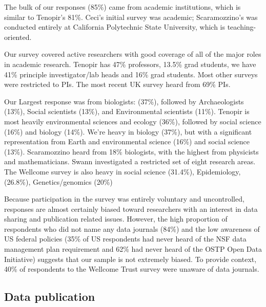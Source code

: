 \documentclass[10pt]{article}
\begin{document}
The bulk of our responses (85\%) came from academic institutions, which is similar to Tenopir's 81\%.  
Ceci's initial survey was academic\cite{ceci_scientists_1988}; Scaramozzino's was conducted entirely at California Polytechnic State University, which is teaching-oriented\cite{scaramozzino_study_2012}. 

Our survey covered active researchers with good coverage of all of the major roles in academic research.
Tenopir has 47\% professors, 13.5\% grad students, we have 41\% principle investigator/lab heads and 16\% grad students.
Most other surveys were restricted to PIs.
The most recent UK survey heard from 69\% PIs\cite{bobrow_establishing_2014}.

Our Largest response was from biologists: (37\%), followed by Archaeologists (13\%), Social scientists (13\%), and Environmental scientists (11\%). 
Tenopir is most heavily environmental sciences and ecology (36\%), followed by social science (16\%) and biology (14\%). 
We're heavy in biology (37\%), but with a significant representation from Earth and environmental science (16\%) and social science (13\%). 
Scaramozzino heard from 18\% biologists, with the highest from physicists and mathematicians.
Swann investigated a restricted set of eight research areas.
The Wellcome survey is also heavy in social science (31.4\%), Epidemiology, (26.8\%), Genetics/genomics (20\%)

Because participation in the survey was entirely voluntary and uncontrolled, responses are almost certainly biased toward researchers with an interest in data sharing and publication related issues.
However, the high proportion of respondents who did not name any data journals (84\%) and the low awareness of US federal policies (35\% of US respondents had never heard of the NSF data management plan requirement and 62\% had never heard of the OSTP Open Data Initiative) suggests that our sample is not extremely biased.
To provide context, 40\% of respondents to the Wellcome Trust survey were unaware of data journals.


\subsection*{Data publication}
\end{document}
